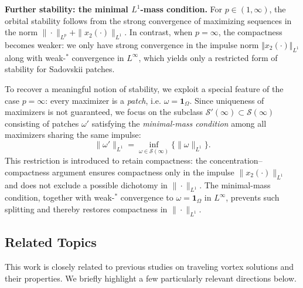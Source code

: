 \documentclass[11pt]{amsart}
\theoremstyle{definition}
\theoremstyle{definition}
\numberwithin{equation}{section}
\newcommand{\nrm}[1]{\Vert#1\Vert}
\newcommand{\0}{\emptyset}
\newcommand{\calS}{\mathcal S}
\newcommand{\bfone}{\mathbf1}
\begin{document}
	\medskip
	
	\noindent\textbf{Further stability: the minimal $L^1$-mass condition.}
	For $p \in (1,\infty)$, the {orbital} stability follows from the strong convergence of maximizing sequences in the norm $\|\cdot\|_{L^p} + \|x_2(\cdot)\|_{L^1}$.
	In contrast, when $p=\infty$, the compactness becomes weaker: we only have strong convergence in the impulse norm $\nrm{x_2(\cdot)}_{L^1}$ along with weak-$^*$ convergence in $L^\infty$, which yields only a restricted form of stability for Sadovskii patches.
	
	\medskip
	
	\noindent To recover a meaningful notion of stability, we exploit a special feature of the case $p=\infty$: every maximizer is a \emph{patch}, i.e. $\omega = \bfone_{\Omega}$.
	Since uniqueness of maximizers is not guaranteed, we focus on the subclass $\calS'(\infty)\subset\calS(\infty)$ consisting of patches $\omega'$ satisfying the \emph{minimal-mass condition} 
    among all maximizers sharing the same impulse:
    $$\|\omega'\|_{L^1} =\inf_{\omega\in \calS(\infty)}\{\|\omega\|_{L^1}\}.$$
	This restriction is introduced to retain compactness: the concentration--compactness argument ensures compactness only in the impulse $\|x_2(\cdot)\|_{L^1}$ and does not exclude a possible dichotomy in $\|\cdot\|_{L^1}$.
	The minimal-mass condition, together with weak-$^*$ convergence to $\omega = \bfone_{\Omega}$ in $L^\infty$,  prevents such splitting and thereby restores compactness in $\|\cdot\|_{L^1}$.
	
	
	
	
	
	\subsection{Related Topics} \label{subsec:refs}
	This work is closely related to previous studies on traveling vortex solutions and their properties.
	We briefly highlight a few particularly relevant directions below.\\
	
\end{document}
